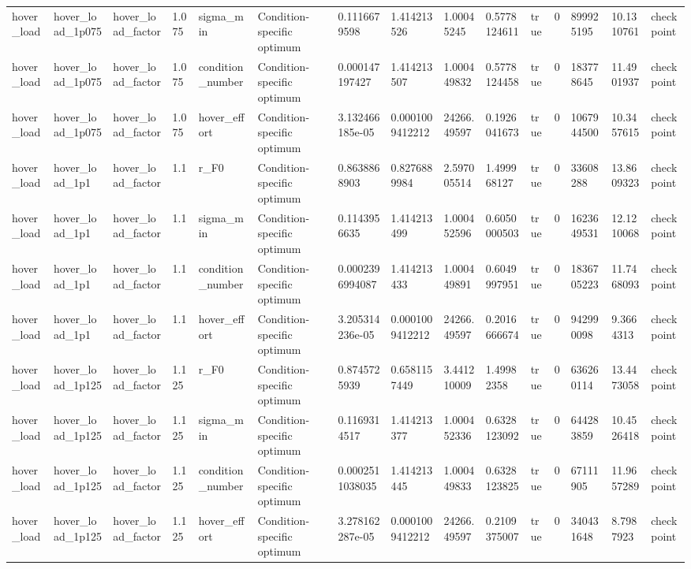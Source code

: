 \begin{tabular}{@{}lllllllllllllll@{}}
hover\_load & hover\_load\_1p075 & hover\_load\_factor & 1.075 & sigma\_min & Condition-specific optimum & 0.1116679598 & 1.414213526 & 1.00045245 & 0.5778124611 & true & 0 & 899925195 & 10.1310761 & checkpoint \\
hover\_load & hover\_load\_1p075 & hover\_load\_factor & 1.075 & condition\_number & Condition-specific optimum & 0.000147197427 & 1.414213507 & 1.000449832 & 0.5778124458 & true & 0 & 183778645 & 11.4901937 & checkpoint \\
hover\_load & hover\_load\_1p075 & hover\_load\_factor & 1.075 & hover\_effort & Condition-specific optimum & 3.132466185e-05 & 0.0001009412212 & 24266.49597 & 0.1926041673 & true & 0 & 1067944500 & 10.3457615 & checkpoint \\
hover\_load & hover\_load\_1p1 & hover\_load\_factor & 1.1 & r\_F0 & Condition-specific optimum & 0.8638868903 & 0.8276889984 & 2.597005514 & 1.499968127 & true & 0 & 33608288 & 13.8609323 & checkpoint \\
hover\_load & hover\_load\_1p1 & hover\_load\_factor & 1.1 & sigma\_min & Condition-specific optimum & 0.1143956635 & 1.414213499 & 1.000452596 & 0.6050000503 & true & 0 & 1623649531 & 12.1210068 & checkpoint \\
hover\_load & hover\_load\_1p1 & hover\_load\_factor & 1.1 & condition\_number & Condition-specific optimum & 0.0002396994087 & 1.414213433 & 1.000449891 & 0.6049997951 & true & 0 & 1836705223 & 11.7468093 & checkpoint \\
hover\_load & hover\_load\_1p1 & hover\_load\_factor & 1.1 & hover\_effort & Condition-specific optimum & 3.205314236e-05 & 0.0001009412212 & 24266.49597 & 0.2016666674 & true & 0 & 942990098 & 9.3664313 & checkpoint \\
hover\_load & hover\_load\_1p125 & hover\_load\_factor & 1.125 & r\_F0 & Condition-specific optimum & 0.8745725939 & 0.6581157449 & 3.441210009 & 1.49982358 & true & 0 & 636260114 & 13.4473058 & checkpoint \\
hover\_load & hover\_load\_1p125 & hover\_load\_factor & 1.125 & sigma\_min & Condition-specific optimum & 0.1169314517 & 1.414213377 & 1.000452336 & 0.6328123092 & true & 0 & 644283859 & 10.4526418 & checkpoint \\
hover\_load & hover\_load\_1p125 & hover\_load\_factor & 1.125 & condition\_number & Condition-specific optimum & 0.0002511038035 & 1.414213445 & 1.000449833 & 0.6328123825 & true & 0 & 67111905 & 11.9657289 & checkpoint \\
hover\_load & hover\_load\_1p125 & hover\_load\_factor & 1.125 & hover\_effort & Condition-specific optimum & 3.278162287e-05 & 0.0001009412212 & 24266.49597 & 0.2109375007 & true & 0 & 340431648 & 8.7987923 & checkpoint \\

\end{tabular}
